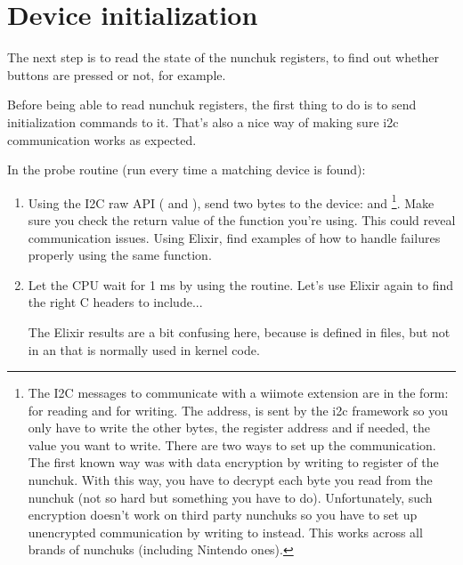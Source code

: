 \section{Device initialization}

The next step is to read the state of the nunchuk registers, to find out
whether buttons are pressed or not, for example.

Before being able to read nunchuk registers, the first thing to do is
to send initialization commands to it. That's also a nice way of making
sure i2c communication works as expected.

In the probe routine (run every time a matching device is found):

\begin{enumerate}
\item Using the I2C raw API ( and
        ), send two bytes to the
        device:  and \footnote{
	The I2C messages to communicate with a wiimote
        extension are in the form: 
        for reading and  for
        writing. The address,  is sent by the i2c framework
        so you only have to write the other bytes, the register
        address and if needed, the value you want to write. There are
        two ways to set up the communication. The first known way was
        with data encryption by writing  to register
         of the nunchuk.  With this way, you have to
        decrypt each byte you read from the nunchuk (not so hard but
        something you have to do).  Unfortunately, such encryption
        doesn't work on third party nunchuks so you have to set up
        unencrypted communication by writing  to
         instead. This works across all brands of nunchuks
        (including Nintendo ones).}.
      Make sure you check the return value of the function you're
      using. This could reveal communication issues.  Using Elixir, find
      examples of how to handle failures properly using the same
      function.

\item Let the CPU wait for 1 ms by using the  routine.
      Let's use Elixir again to find the right C headers to include...

      The Elixir results are a bit confusing here, because
       is defined in  files,
      but not in an  that is normally used
      in kernel code.


\end{enumerate}

